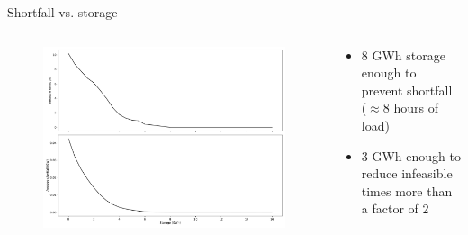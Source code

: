 \documentclass[aspectratio=169,11pt]{beamer}
\begin{document}
\begin{frame}{Shortfall vs. storage}
\begin{columns}
    \begin{column}{0.6\textwidth}
        \begin{figure}
            \centering
            \includegraphics[width=\columnwidth]{./figures/p1.pdf}
        \end{figure}
    \end{column}
    \begin{column}{0.4\textwidth}
        \begin{itemize}
            \item $8$ GWh storage enough to prevent shortfall ($\approx 8$ hours of load)
            \item $3$ GWh enough to reduce infeasible times more than a factor of $2$
        \end{itemize}
    \end{column}
\end{columns}
\end{frame}
\end{document}
